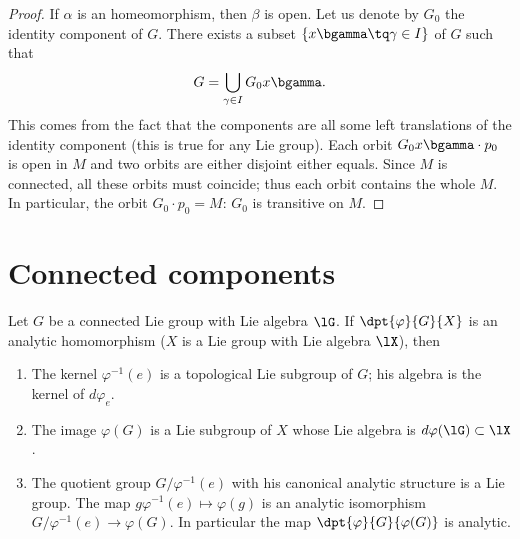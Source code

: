 \begin{proof}
If $\alpha$ is an homeomorphism, then $\beta$ is open. Let us denote by $G_0$ the identity component of $G$. There exists a subset $\{x\bgamma\tq\gamma\in I\}$ of $G$ such that
\[
    G=\bigcup_{\gamma\in I}G_0x\bgamma.
\]
This comes from the fact that the components are all some left translations of the identity component (this is true for any Lie group). Each orbit $G_0x\bgamma\cdot p_0$ is open in $M$ and two orbits are either disjoint either equals. Since $M$ is connected, all these orbits must coincide; thus each orbit contains the whole $M$. In particular, the orbit $G_0\cdot p_0=M$: $G_0$ is transitive on $M$.

\end{proof}

\section{Connected components}

\begin{lemma}\label{lem:vp_G_X}
    Let $G$ be a connected Lie group with Lie algebra $\lG$. If $\dpt{\varphi}{G}{X}$ is an analytic homomorphism ($X$ is a Lie group with Lie algebra $\lX$), then

    \begin{enumerate}
    \item The kernel $\varphi^{-1}(e)$ is a topological Lie subgroup of $G$; his algebra is the kernel of $d\varphi_e$.
    \item The image $\varphi(G)$ is a Lie subgroup of $X$ whose Lie algebra is $d\varphi(\lG)\subset\lX$.
    \item The quotient group $G/\varphi^{-1}(e)$ with his canonical analytic structure is a Lie group. The map $g\varphi^{-1}(e)\mapsto\varphi(g)$ is an analytic isomorphism $G/\varphi^{-1}(e)\to\varphi(G)$. In particular the map $\dpt{\varphi}{G}{\varphi(G)}$ is analytic.
    \end{enumerate}
\end{lemma}

